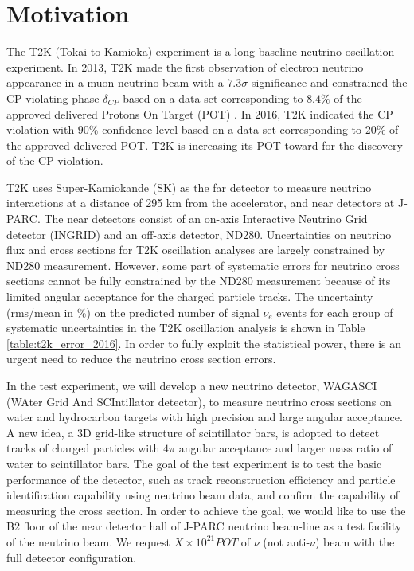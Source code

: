 \section{Motivation}
The T2K (Tokai-to-Kamioka) experiment is a long baseline neutrino oscillation experiment.
In 2013, T2K made the first observation of electron neutrino appearance in a muon neutrino beam
with a $7.3\sigma$ significance and constrained the CP violating phase $\delta_{CP}$ based on
a data set corresponding to $8.4\%$ of the approved delivered Protons On Target (POT) \cite{t2k_nue_appearance_2013}.
In 2016, T2K indicated the CP violation with $90\%$ confidence level based on
a data set corresponding to $20\%$ of the approved delivered POT\cite{t2k_cp_2016}.
T2K is increasing its POT toward for the discovery of the CP violation.


T2K uses Super-Kamiokande (SK) as the far detector to measure neutrino interactions
at a distance of 295 km from the accelerator, and near detectors at J-PARC.
The near detectors consist of an on-axis Interactive Neutrino Grid detector (INGRID)
and an off-axis detector, ND280.
Uncertainties on neutrino flux and cross sections for T2K oscillation analyses are largely constrained
by ND280 measurement.
However, some part of systematic errors for neutrino cross sections cannot be fully constrained by the ND280 measurement because of its limited angular acceptance for the charged particle tracks.
The uncertainty (rms/mean in \%) on the predicted number of signal $\nu_{e}$ events for each group
of systematic uncertainties in the T2K oscillation analysis \cite{t2K_cp_2016} is shown in Table \ref{table:t2k_error_2016}.
In order to fully exploit the statistical power, there is an urgent need to reduce the neutrino cross section errors.


In the test experiment, we will develop a new neutrino detector, WAGASCI (WAter Grid And SCIntillator detector), to measure neutrino cross sections
on water and hydrocarbon targets with high precision and large angular acceptance.
A new idea, a 3D grid-like structure of scintillator bars, is adopted to detect tracks of charged particles
with $4\pi$ angular acceptance and larger mass ratio of water to scintillator bars.
The goal of the test experiment is to test the basic performance of the detector,
such as track reconstruction efficiency and particle identification capability using neutrino beam data,
and confirm the capability of measuring the cross section.
In order to achieve the goal, we would like to use the B2 floor of the near detector hall of J-PARC neutrino beam-line as a test facility of the neutrino beam.
We request $X \times 10^{21} POT$ of $\nu$ (not anti-$\nu$) beam with the full detector configuration.
